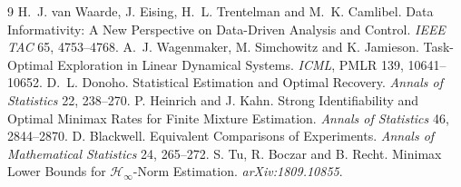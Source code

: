 \begin{thebibliography}{9}\small
{} H.~J. van Waarde, J. Eising,
H.~L. Trentelman and M.~K. Camlibel. Data Informativity: A New Perspective on
Data-Driven Analysis and Control. \emph{IEEE TAC} 65, 4753--4768.
 A.~J. Wagenmaker,
M. Simchowitz and K. Jamieson. Task-Optimal Exploration in Linear Dynamical
Systems. \emph{ICML}, PMLR 139, 10641--10652.
 D.~L. Donoho. Statistical Estimation and
Optimal Recovery. \emph{Annals of Statistics} 22, 238--270.
 P. Heinrich and J. Kahn.
Strong Identifiability and Optimal Minimax Rates for Finite Mixture Estimation.
\emph{Annals of Statistics} 46, 2844--2870.
 D. Blackwell. Equivalent Comparisons
of Experiments. \emph{Annals of Mathematical Statistics} 24, 265--272.
 S. Tu, R. Boczar and B. Recht.
Minimax Lower Bounds for $\mathcal H_\infty$-Norm Estimation.
\emph{arXiv:1809.10855}.
\end{thebibliography}
